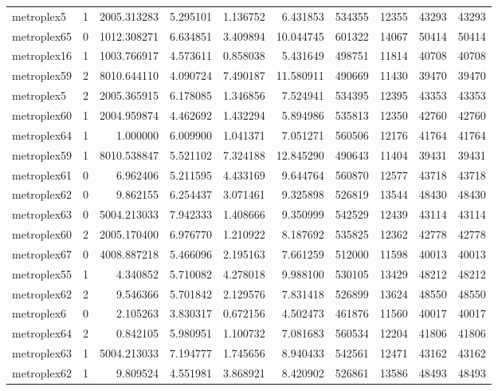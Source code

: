 \begin{longtable}{|l|r|r|r|r|r|r|r|r|r|}
metroplex5 & 1 & 2005.313283 & 5.295101 & 1.136752 & 6.431853 & 534355 & 12355 & 43293 & 43293 \\
metroplex65 & 0 & 1012.308271 & 6.634851 & 3.409894 & 10.044745 & 601322 & 14067 & 50414 & 50414 \\
metroplex16 & 1 & 1003.766917 & 4.573611 & 0.858038 & 5.431649 & 498751 & 11814 & 40708 & 40708 \\
metroplex59 & 2 & 8010.644110 & 4.090724 & 7.490187 & 11.580911 & 490669 & 11430 & 39470 & 39470 \\
metroplex5 & 2 & 2005.365915 & 6.178085 & 1.346856 & 7.524941 & 534395 & 12395 & 43353 & 43353 \\
metroplex60 & 1 & 2004.959874 & 4.462692 & 1.432294 & 5.894986 & 535813 & 12350 & 42760 & 42760 \\
metroplex64 & 1 & 1.000000 & 6.009900 & 1.041371 & 7.051271 & 560506 & 12176 & 41764 & 41764 \\
metroplex59 & 1 & 8010.538847 & 5.521102 & 7.324188 & 12.845290 & 490643 & 11404 & 39431 & 39431 \\
metroplex61 & 0 & 6.962406 & 5.211595 & 4.433169 & 9.644764 & 560870 & 12577 & 43718 & 43718 \\
metroplex62 & 0 & 9.862155 & 6.254437 & 3.071461 & 9.325898 & 526819 & 13544 & 48430 & 48430 \\
metroplex63 & 0 & 5004.213033 & 7.942333 & 1.408666 & 9.350999 & 542529 & 12439 & 43114 & 43114 \\
metroplex60 & 2 & 2005.170400 & 6.976770 & 1.210922 & 8.187692 & 535825 & 12362 & 42778 & 42778 \\
metroplex67 & 0 & 4008.887218 & 5.466096 & 2.195163 & 7.661259 & 512000 & 11598 & 40013 & 40013 \\
metroplex55 & 1 & 4.340852 & 5.710082 & 4.278018 & 9.988100 & 530105 & 13429 & 48212 & 48212 \\
metroplex62 & 2 & 9.546366 & 5.701842 & 2.129576 & 7.831418 & 526899 & 13624 & 48550 & 48550 \\
metroplex6 & 0 & 2.105263 & 3.830317 & 0.672156 & 4.502473 & 461876 & 11560 & 40017 & 40017 \\
metroplex64 & 2 & 0.842105 & 5.980951 & 1.100732 & 7.081683 & 560534 & 12204 & 41806 & 41806 \\
metroplex63 & 1 & 5004.213033 & 7.194777 & 1.745656 & 8.940433 & 542561 & 12471 & 43162 & 43162 \\
metroplex62 & 1 & 9.809524 & 4.551981 & 3.868921 & 8.420902 & 526861 & 13586 & 48493 & 48493 \\

\end{longtable}
